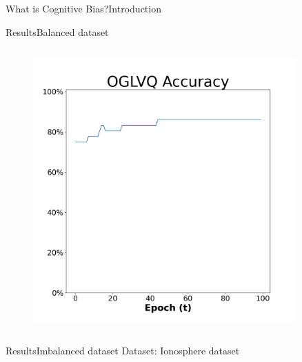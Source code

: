 \documentclass[
	aspectratio=169,	%
	onlytextwidth,		%
	t,					%
	]{beamer}
\begin{document}
\begin{frame}[fragile]{What is Cognitive Bias?}{Introduction}
\begin{frame}[fragile]{Results}{Balanced dataset}
\begin{columns}
			\begin{column}[T]{0.33\textwidth}
				\begin{figure}
						\includegraphics[width=0.9\textwidth]{myfigs/OGLVQ_b_res.png}
					\end{figure}
				\end{column}
			
			
			\end{columns}
			
		\end{frame}
		
		\begin{frame}[fragile]{Results}{Imbalanced dataset}
			\scriptsize
			Dataset: Ionosphere dataset~\cite{ion} 
			\newline
			
			\begin{columns}
				

\end{columns}
\end{frame}
\end{frame}
\end{document}
